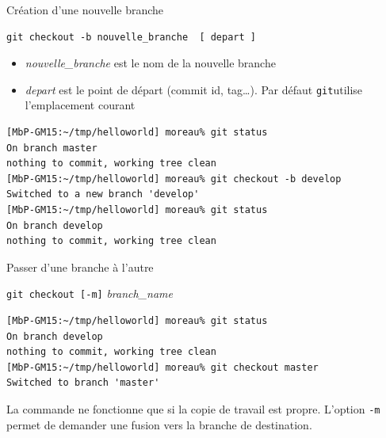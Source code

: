\begin{frame}[fragile]{%
\protect\hypertarget{cruxe9ation-dune-nouvelle-branche}{%
Création d’une nouvelle branche}}

\begin{verbatim}
git checkout -b nouvelle_branche  [ depart ]
\end{verbatim}

\begin{itemize}
\tightlist
\item
  \emph{nouvelle\_branche} est le nom de la nouvelle branche
\item
  \emph{depart} est le point de départ (commit id, tag\ldots{}). Par
  défaut \texttt{git}utilise l’emplacement courant
\end{itemize}

\begin{lstlisting}
[MbP-GM15:~/tmp/helloworld] moreau% git status
On branch master
nothing to commit, working tree clean
[MbP-GM15:~/tmp/helloworld] moreau% git checkout -b develop
Switched to a new branch 'develop'
[MbP-GM15:~/tmp/helloworld] moreau% git status
On branch develop
nothing to commit, working tree clean
\end{lstlisting}

\end{frame}

\begin{frame}[fragile]{%
\protect\hypertarget{passer-dune-branche-uxe0-lautres}{%
Passer d’une branche à l’autre}}

\texttt{git\ checkout\ {[}-m{]}} \emph{branch\_name}

\begin{lstlisting}
[MbP-GM15:~/tmp/helloworld] moreau% git status
On branch develop
nothing to commit, working tree clean
[MbP-GM15:~/tmp/helloworld] moreau% git checkout master
Switched to branch 'master'
\end{lstlisting}

La commande ne fonctionne que si la copie de travail est propre.
L’option \texttt{-m} permet de demander une fusion vers la branche de
destination.

\end{frame}

